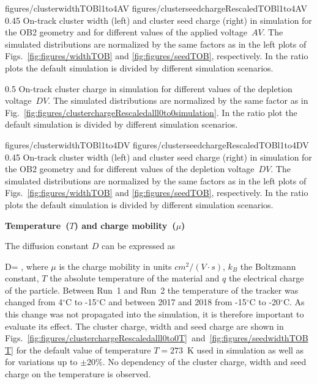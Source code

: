                  {figures/clusterwidthTOBl1to4AV}
                 {figures/clusterseedchargeRescaledTOBl1to4AV} %
                 {0.45}       %
                 {  On-track cluster width (left) and cluster seed charge (right) in simulation  for the OB2 geometry and for different values of the applied voltage~$AV$. The simulated distributions are normalized by the same factors as in the left plots of Figs.~\ref{fig:figures/widthTOB} and \ref{fig:figures/seedTOB}, respectively.   In the ratio plots the default simulation is divided by different simulation scenarios. }


                 {0.5}       %
                 {  On-track cluster charge in simulation for different values of the depletion voltage~$DV$.   The simulated distributions are normalized by the same factor as in Fig.~\ref{fig:figures/clusterchargeRescaledalll0to0simulation}.  In the ratio plot the default simulation is divided by different simulation scenarios. }

                 {figures/clusterwidthTOBl1to4DV}
                 {figures/clusterseedchargeRescaledTOBl1to4DV} %
                 {0.45}       %
                 {  On-track cluster width (left) and cluster seed charge (right) in simulation  for the OB2 geometry and for different values of the depletion voltage~$DV$.  The simulated distributions are normalized by the same factors as in the left plots of Figs.~\ref{fig:figures/widthTOB} and \ref{fig:figures/seedTOB}, respectively.   In the ratio plots the default simulation is divided by different simulation scenarios. }

\textbf{Temperature~($T$) and charge mobility~($\mu$)}

The diffusion constant $D$ can be expressed as

{
   D=  ,
}
where $\mu$ is the charge mobility in units $cm^{2}/(V \cdot s)$, $k_{B}$ the Boltzmann constant, $T$ the absolute temperature of the material and $q$ the electrical charge of the particle. Between Run~1 and Run~2 the temperature of the tracker was changed from 4$^{\circ}$C to -15$^{\circ}$C and between 2017 and 2018 from -15$^{\circ}$C to -20$^{\circ}$C. As this change was not propagated into the simulation, it is therefore important to evaluate its effect. The cluster charge, width and seed charge are shown in Figs.~\ref{fig:figures/clusterchargeRescaledalll0to0T}~and~\ref{fig:figures/seedwidthTOBT} for the default value of temperature $T=273$~K used in simulation as well as for variations up to $\pm 20\%$. No dependency of the cluster charge, width and seed charge on the temperature is observed. 

